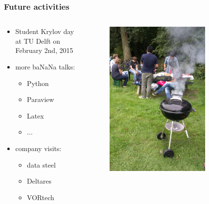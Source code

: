 \documentclass{beamer}
\begin{document}
\begin{frame}
\frametitle{Future activities}
\begin{columns}
 \begin{column}{0.8\textwidth}
 \begin{itemize}
  \item Student Krylov day at TU Delft on February 2nd, 2015
  \item more ba{\color{red}NaN}a talks:
  \begin{itemize}
      \item Python
      \item Paraview
      \item Latex
      \item ...
  \end{itemize}
  \item company visits:
    \begin{itemize}
      \item data steel
      \item Deltares
      \item VORtech
  \end{itemize}
 \end{itemize}

 \end{column}

 \begin{column}{0.4\textwidth}
  \begin{figure}[t]
  \centering
  \includegraphics[width=0.8\textwidth]{images/bbq}
  \end{figure}
 \end{column}
 \end{columns}
\end{frame}
\end{document}
